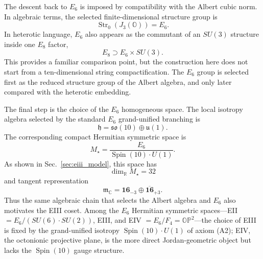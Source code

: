 \documentclass[aps,prd,preprint,longbibliography,nofootinbib,superscriptaddress,floatfix]{revtex4-2}
\newcommand{\Spin}{\operatorname{Spin}}
\newcommand{\Str}{\operatorname{Str}}
\begin{document}
The descent back to \(E_6\) is imposed by compatibility with the Albert cubic
norm. In algebraic terms, the selected finite-dimensional structure group is
\begin{equation}
    \Str_0(J_3(\mathbb O))=E_6.
    \label{eq:mj_descent_e6}
\end{equation}
In heterotic language, \(E_6\) also appears as the commutant of an \(SU(3)\)
structure inside one \(E_8\) factor,
\begin{equation}
    E_8\supset E_6\times SU(3).
    \label{eq:mj_e8_e6_su3}
\end{equation}
This provides a familiar comparison point, but the construction here does not
start from a ten-dimensional string compactification. The \(E_6\) group is
selected first as the reduced structure group of the Albert algebra, and only
later compared with the heterotic embedding.

The final step is the choice of the \(E_6\) homogeneous space. The local
isotropy algebra selected by the standard \(E_6\) grand-unified branching is
\begin{equation}
    \mathfrak h
    =
    \mathfrak{so}(10)\oplus\mathfrak u(1).
    \label{eq:mj_e6_isotropy}
\end{equation}
The corresponding compact Hermitian symmetric space is
\begin{equation}
    M_\star
    =
    \frac{E_6}{\Spin(10)\cdot U(1)}.
    \label{eq:mj_eiii_selected}
\end{equation}
As shown in Sec.~\ref{sec:eiii_model}, this space has
\begin{equation}
    \dim_{\mathbb R}M_\star=32
    \label{eq:mj_eiii_dimension}
\end{equation}
and tangent representation
\begin{equation}
    \mathfrak m_{\mathbb C}
    =
    \mathbf{16}_{-3}
    \oplus
    \overline{\mathbf{16}}_{+3}.
    \label{eq:mj_eiii_tangent}
\end{equation}
Thus the same algebraic chain that selects the Albert algebra and \(E_6\) also
motivates the EIII coset. Among the \(E_6\) Hermitian symmetric spaces---EII
\(=E_6/(SU(6)\cdot SU(2))\), EIII, and EIV \(=E_6/F_4=\mathbb{OP}^2\)---the
choice of EIII is fixed by the grand-unified isotropy \(\Spin(10)\cdot U(1)\) of
axiom (A2); EIV, the octonionic projective plane, is the more direct
Jordan-geometric object but lacks the \(\Spin(10)\) gauge structure.
\end{document}
